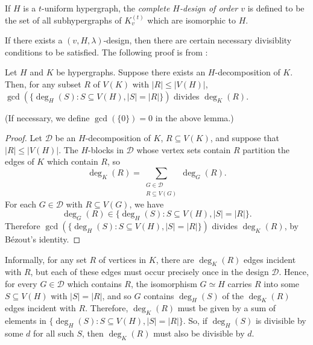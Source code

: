 If $H$ is a $t$-uniform hypergraph, the {\em complete $H$-design of order $v$} is defined to be the set of all subhypergraphs of $K_{v}^{(t)}$ which are isomorphic to $H$.



If there exists a $(v, H, \lambda)$-design, then there are certain necessary divisiblity conditions to be satisfied.
The following proof is from \cite{bryant}:

\begin{lemma} \label{obv-necessary-1}
Let $H$ and $K$ be hypergraphs. Suppose there exists an $H$-decomposition of $K$.
Then, for any subset $R$ of $V(K)$ with $|R| \leq |V(H)|$,
$\gcd(\{\deg_H(S) : S \subseteq V(H), |S| = |R|\})$ divides $\deg_K(R)$.
\end{lemma}

(If necessary, we define $\gcd(\{0\}) = 0$ in the above lemma.)

\begin{proof}
Let $\mathcal{D}$ be an $H$-decomposition of $K$, $R \subseteq V(K)$, and suppose that $|R| \leq |V(H)|$.
The $H$-blocks in $\mathcal{D}$ whose vertex sets contain $R$ partition the edges of $K$ which contain $R$, so
\begin{equation} \label{eq:degree-sum}
    \deg_K(R) = \sum_{\substack{G \in \mathcal{D} \\ R \subseteq V(G)}} \deg_G(R).
\end{equation}
For each $G \in \mathcal{D}$ with $R \subseteq V(G)$, we have
\[
    \deg_G(R) \in \{\deg_H(S) : S \subseteq V(H), |S| = |R|\}.
\]
Therefore $\gcd(\{\deg_H(S) : S \subseteq V(H), |S| = |R|\})$ divides $\deg_K(R)$, by B\'{e}zout's identity.
\end{proof}

Informally, for any set $R$ of vertices in $K$, there are $\deg_K(R)$ edges incident with $R$,
but each of these edges must occur precisely once in the design $\mathcal{D}$.
Hence, for every $G \in \mathcal{D}$ which contains $R$, the isomorphism $G \simeq H$
carries $R$ into some $S \subseteq V(H)$ with $|S| = |R|$, and so $G$ contains
$\deg_H(S)$ of the $\deg_K(R)$ edges incident with $R$.
Therefore, $\deg_K(R)$ must be given by a sum of elements in $\{\deg_H(S) : S \subseteq V(H), |S| = |R|\}$.
So, if $\deg_H(S)$ is divisible by some $d$ for all such $S$, then $\deg_K(R)$ must also be divisible by $d$.

